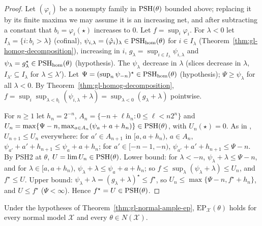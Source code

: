 \begin{proof}
Let $(\varphi_i)$ be a nonempty family in $\operatorname{PSH}(\theta)$ bounded above; replacing it by its finite maxima we may assume it is an increasing net, and after subtracting a
constant that $b_i=\varphi_i(\star)$ increases to $0$. Let $f=\sup_i\varphi_i$. For $\lambda<0$ let $I_\lambda=\{i:b_i>\lambda\}$ (cofinal), $\psi_{i,\lambda}=(\hat\varphi_i)_\lambda
\in\operatorname{PSH}_{\mathrm{hom}}(\theta)$ for $i\in I_\lambda$ (Theorem~\ref{thm:gl-homog-decomposition}), increasing in $i$, $g_\lambda=\sup_{i\in I_\lambda}\psi_{i,\lambda}$ and
$\psi_\lambda=g_\lambda^\star\in\operatorname{PSH}_{\mathrm{hom}}(\theta)$ (hypothesis). The $\psi_\lambda$ decrease in $\lambda$ (slices decrease in $\lambda$, $I_{\lambda'}\subseteq I_\lambda$ for
$\lambda\le\lambda'$). Let $\Psi=(\sup_n\psi_{-n})^\star\in\operatorname{PSH}_{\mathrm{hom}}(\theta)$ (hypothesis); $\Psi\ge\psi_\lambda$ for all $\lambda<0$. By
Theorem~\ref{thm:gl-homog-decomposition}, $f=\sup_i\sup_{\lambda<b_i}(\psi_{i,\lambda}+\lambda)=\sup_{\lambda<0}(g_\lambda+\lambda)$ pointwise.

For $n\ge1$ let $h_n=2^{-n}$, $A_n=\{-n+\ell h_n:0\le\ell<n2^n\}$ and $U_n=\max\{\Psi-n,\max_{a\in A_n}(\psi_a+a+h_n)\}\in\operatorname{PSH}(\theta)$, with $U_n(\star)=0$. As in
\cite{FHX}, $U_{n+1}\le U_n$ everywhere: for $a'\in A_{n+1}$ in $[a,a+h_n)$, $a\in A_n$, $\psi_{a'}+a'+h_{n+1}\le\psi_a+a+h_n$; for $a'\in[-n-1,-n)$,
$\psi_{a'}+a'+h_{n+1}\le\Psi-n$. By PSH2 at $\theta$, $U=\lim U_n\in\operatorname{PSH}(\theta)$. Lower bound: for $\lambda<-n$, $\psi_\lambda+\lambda\le\Psi-n$, and for $\lambda\in[a,a+h_n)$,
$\psi_\lambda+\lambda\le\psi_a+a+h_n$; so $f\le\sup_\lambda(\psi_\lambda+\lambda)\le U_n$, and $f^\star\le U$. Upper bound: $\psi_\lambda+\lambda=(g_\lambda+\lambda)^\star\le f^\star$, so
$U_n\le\max\{\Psi-n,f^\star+h_n\}$, and $U\le f^\star$ ($\Psi<\infty$). Hence $f^\star=U\in\operatorname{PSH}(\theta)$.
\end{proof}

\begin{corollary}\label{cor:gl-normal-ep}
\leanok
{}
Under the hypotheses of Theorem~\ref{thm:gl-normal-ample-ep}, $\mathrm{EP}_{\mathcal X}(\theta)$ holds for every normal model $\mathcal X$ and every $\theta\in N(\mathcal X)$.
\end{corollary}


